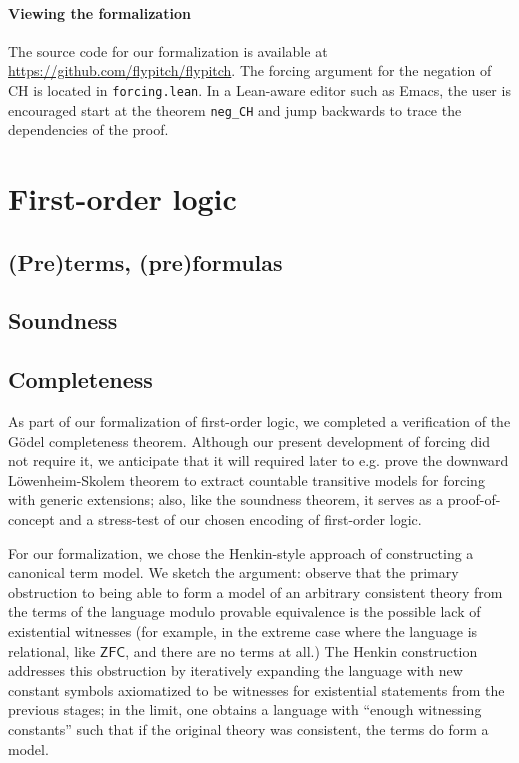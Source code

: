 \documentclass[a4paper,USenglish,cleveref, autoref]{lipics-v2019}
\begin{document}
\paragraph*{Viewing the formalization}
The source code for our formalization is available at \url{https://github.com/flypitch/flypitch}. The forcing argument for the negation of CH is located in \lstinline{forcing.lean}. In a Lean-aware editor such as Emacs, the user is encouraged start at the theorem \lstinline{neg_CH} and jump backwards to trace the dependencies of the proof.
\section{First-order logic}
\label{sect:fol}

\subsection{(Pre)terms, (pre)formulas}

\subsection{Soundness}

\subsection{Completeness}
As part of our formalization of first-order logic, we completed a verification of the G\"odel completeness theorem. Although our present development of forcing did not require it, we anticipate that it will required later to e.g. prove the downward L\"owenheim-Skolem theorem to extract countable transitive models for forcing with generic extensions; also, like the soundness theorem, it serves as a proof-of-concept and a stress-test of our chosen encoding of first-order logic.

For our formalization, we chose the Henkin-style approach of constructing a canonical term model. We sketch the argument: observe that the primary obstruction to being able to form a model of an arbitrary consistent theory from the terms of the language modulo provable equivalence is the possible lack of existential witnesses (for example, in the extreme case where the language is relational, like $\mathsf{ZFC}$, and there are no terms at all.) The Henkin construction addresses this obstruction by iteratively expanding the language with new constant symbols axiomatized to be witnesses for existential statements from the previous stages; in the limit, one obtains a language with ``enough witnessing constants'' such that if the original theory was consistent, the terms do form a model.
\end{document}
